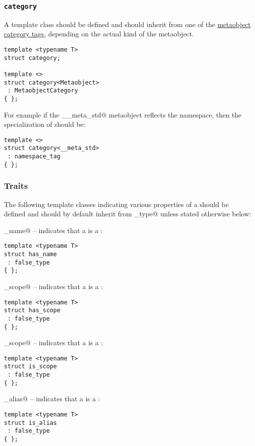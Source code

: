 \subsubsection{\texttt{category}}

A template class \verb@category@ should be defined and should inherit from
one of the \hyperref[metaobject-category-tags]{metaobject category tags}, depending on
the actual kind of the metaobject.

\begin{verbatim}
template <typename T>
struct category;

template <>
struct category<Metaobject>
 : MetaobjectCategory
{ };
\end{verbatim}

For example if the \verb@__meta_std@ metaobject reflects the \verb@std@ namespace,
then the specialization of \verb@category@ should be:

\begin{verbatim}
template <>
struct category<__meta_std>
 : namespace_tag
{ };
\end{verbatim}

\subsubsection{Traits}

The following template classes indicating various properties of a 
should be defined and should by default inherit from \verb@false_type@ unless stated
otherwise below:

\verb@has_name@ -- indicates that a  is a :
\begin{verbatim}
template <typename T>
struct has_name
 : false_type
{ };
\end{verbatim}

\verb@has_scope@ -- indicates that a  is a :
\begin{verbatim}
template <typename T>
struct has_scope
 : false_type
{ };
\end{verbatim}

\verb@is_scope@ -- indicates that a  is a :
\begin{verbatim}
template <typename T>
struct is_scope
 : false_type
{ };
\end{verbatim}

\verb@is_alias@ -- indicates that a  is a :
\begin{verbatim}
template <typename T>
struct is_alias
 : false_type
{ };
\end{verbatim}

